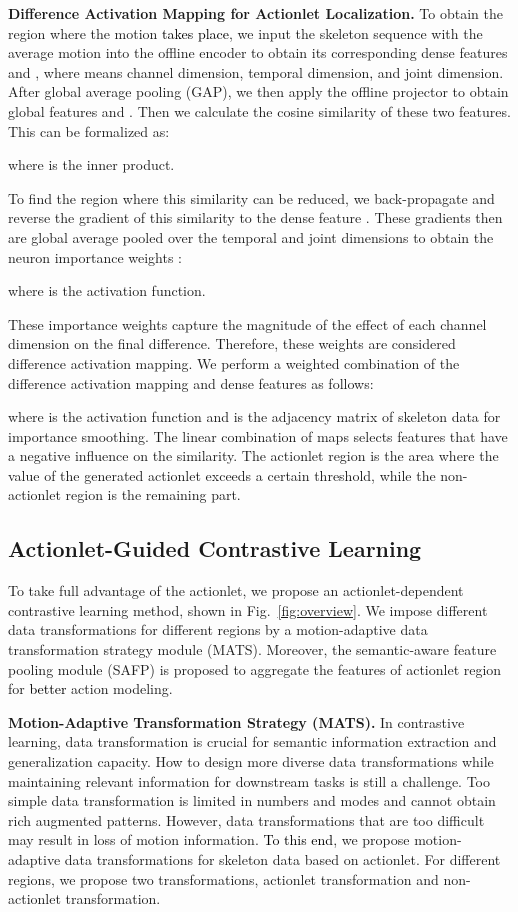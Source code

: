\documentclass[twocolumn]{article}
\newcommand{\wh}[1]{\textcolor{black}{#1}}
\newcommand{\zjh}[1]{\textcolor{black}{#1}}
\begin{document}
\noindent\textbf{Difference Activation Mapping for Actionlet Localization.}
To obtain the region where the motion \wh{takes place}, we input the skeleton sequence  with the average motion  into the offline encoder  to obtain its corresponding dense features  and , where  means channel dimension,  temporal dimension\wh{,} and  joint dimension.
After global average pooling (GAP), we then apply the offline projector  to obtain global features  and .
Then we calculate the cosine similarity of these two features. 
This can be formalized as:

where  is the inner product. 

To find the region where this similarity can be reduced, we back-propagate and reverse the gradient of this similarity to the dense feature . 
These gradients then are global average pooled over the temporal and joint dimensions to obtain the neuron importance weights :

where  is the activation function.

These importance weights capture the magnitude of the effect of each channel dimension on the final difference. Therefore, these weights  are considered difference activation mapping. 
We perform a weighted combination of the difference activation mapping and dense features as follows:

where  is the activation function and  is the adjacency matrix of skeleton data for importance smoothing. The linear combination of maps selects features that have a negative influence on the similarity. The actionlet region is the area where the value of the
generated actionlet  exceeds a certain threshold, while the
non-actionlet region is the remaining part.




\subsection{Actionlet-Guided Contrastive Learning}

To take full advantage of the actionlet, we propose an actionlet-dependent contrastive learning method, shown in Fig.~\ref{fig:overview}.
We impose different data transformations for different regions by a motion-adaptive data transformation strategy module (MATS). 
Moreover, the semantic-aware feature pooling module (SAFP) is proposed to aggregate the features of actionlet region for \wh{better} action modeling.
\vspace{1mm}

\noindent\textbf{Motion-Adaptive Transformation Strategy (MATS).} 
\label{sec:mats}
In contrastive learning, data transformation  is crucial for semantic information extraction and generalization capacity. 
How to design more diverse data transformations while maintaining relevant information for downstream tasks is still a challenge.
Too simple data transformation is limited in numbers and modes and cannot obtain rich augmented patterns. However, data transformations that are too difficult may result in loss of motion information.
\zjh{To this end}, we propose motion-adaptive data transformations for skeleton data based on actionlet.
For different regions, we propose two transformations, actionlet transformation and non-actionlet transformation.
\end{document}
